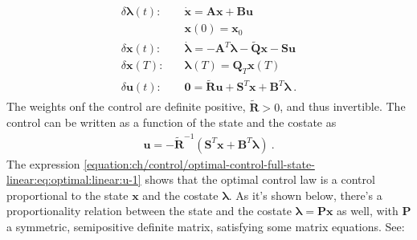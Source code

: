 \documentclass[letterpaper,10pt,english]{jupyterBook}
\begin{document}
\begin{equation}\label{equation:ch/control/optimal-control-full-state-linear:eq:optimal:ode:linear}
\begin{split}\begin{aligned}
 \delta \boldsymbol\lambda(t): & \quad \dot{\mathbf{x}} = \mathbf{A} \mathbf{x} + \mathbf{B} \mathbf{u} \\
                               & \quad \mathbf{x}(0) = \mathbf{x}_0 \\
 \delta \mathbf{x}(t)        : & \quad \dot{\boldsymbol{\lambda}} = - \mathbf{A}^T \boldsymbol\lambda - \widetilde{\mathbf{Q}} \mathbf{x} - \mathbf{S} \mathbf{u} \\
 \delta \mathbf{x}(T)        : & \quad \boldsymbol\lambda(T) = \mathbf{Q}_T \mathbf{x}(T) \\
 \delta \mathbf{u}(t)        : & \quad \mathbf{0} = \widetilde{\mathbf{R}} \mathbf{u} + \mathbf{S}^T \mathbf{x} + \mathbf{B}^T \boldsymbol\lambda \ .
\end{aligned}\end{split}
\end{equation}
\sphinxAtStartPar
The weights onf the control are definite positive, \(\widetilde{\mathbf{R}} > 0\), and thus invertible. The control can be written as a function of the state and the co\sphinxhyphen{}state as
\begin{equation}\label{equation:ch/control/optimal-control-full-state-linear:eq:optimal:linear:u-1}
\begin{split}\mathbf{u} = - \widetilde{\mathbf{R}}^{-1} \left( \mathbf{S}^T \mathbf{x} + \mathbf{B}^T \boldsymbol\lambda  \right) \ .\end{split}
\end{equation}
\sphinxAtStartPar
The expression \eqref{equation:ch/control/optimal-control-full-state-linear:eq:optimal:linear:u-1} shows that the optimal control law is a control proportional to the state \(\mathbf{x}\) and the co\sphinxhyphen{}state \(\boldsymbol\lambda\). As it’s shown below, there’s a proportionality relation between the state and the co\sphinxhyphen{}state \(\boldsymbol\lambda = \mathbf{P} \mathbf{x}\) as well, with \(\mathbf{P}\) a symmetric, semi\sphinxhyphen{}positive definite matrix, satisfying some matrix equations. See:
\end{document}
